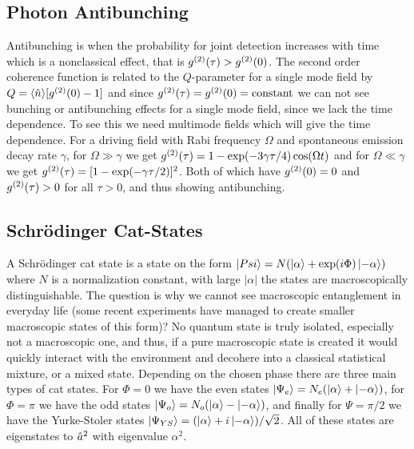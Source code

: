 \subsection{Photon Antibunching}
Antibunching is when the probability for joint detection increases with time which is a nonclassical effect, that is $g^{(2)}(\tau) > g^{(2)}(0)$. The second order coherence function is related to the $Q$-parameter for a single mode field by $Q = \langle \hat{n} \rangle[g^{(2)}(0) - 1]$ and since $g^{(2)}(\tau) = g^{(2)}(0)=\mathrm{constant}$ we can not see bunching or antibunching effects for a single mode field, since we lack the time dependence. To see this we need multimode fields which will give the time dependence. For a driving field with Rabi frequency $\Omega$ and spontaneous emission decay rate $\gamma$, for $\Omega \gg \gamma$ we get $g^{(2)}(\tau) = 1 - \exp(-3\gamma\tau/4)\cos(\Omega t)$ and for $\Omega \ll \gamma$ we get $g^{(2)}(\tau) = [1- \exp(-\gamma\tau/2)]^2$. Both of which have $g^{(2)}(0) = 0$ and $g^{(2)}(\tau) > 0 $ for all $\tau > 0$, and thus showing antibunching.

\subsection{Schrödinger Cat-States}
A Schrödinger cat state is a state on the form $\ket{Psi} = N (\ket{\alpha} + \exp(i\Phi)\ket{-\alpha})$ where $N$ is a normalization constant, with large $|\alpha|$ the states are macroscopically distinguishable. The question is why we cannot see macroscopic entanglement in everyday life (some recent experiments have managed to create smaller macroscopic states of this form)? No quantum state is truly isolated, especially not a macroscopic one, and thus, if a pure macroscopic state is created it would quickly interact with the environment and decohere into a classical statistical mixture, or a mixed state. Depending on the chosen phase there are three main types of cat states. For $\Phi = 0$ we have the even states $\ket{\Psi_e} = N_e (\ket{\alpha} + \ket{-\alpha})$, for $\Phi = \pi$ we have the odd states $\ket{\Psi_o} = N_o (\ket{\alpha} - \ket{-\alpha})$, and finally for $\Psi = \pi/2$ we have the Yurke-Stoler states $\ket{\Psi_{YS}} = (\ket{\alpha} + i\ket{-\alpha})/\sqrt{2}$. All of these states are eigenstates to $\hat{a}^2$ with eigenvalue $\alpha^2$. 

